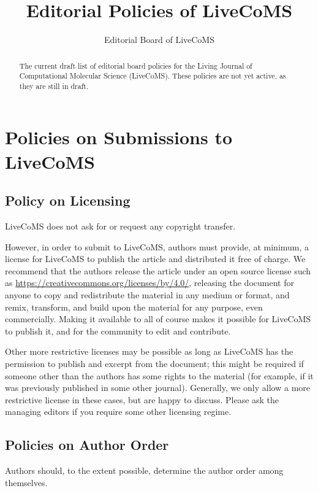 \documentclass{article}
\begin{document}
\title{Editorial Policies of LiveCoMS}
\author{Editorial Board of LiveCoMS}

\maketitle

\begin{abstract}
The current draft list of editorial board policies for the Living
Journal of Computational Molecular Science (LiveCoMS). These policies
are not yet active, as they are still in draft.
\end{abstract}

\section{Policies on Submissions to LiveCoMS}

\subsection{Policy on Licensing}

LiveCoMS does not ask for or request any copyright transfer.

However, in order to submit to LiveCoMS, authors must provide, at
minimum, a license for LiveCoMS to publish the article and distributed
it free of charge. We recommend that the authors release the article
under an open source license such as \href{Creative Commons
  Attribution}{https://creativecommons.org/licenses/by/4.0/},
releasing the document for anyone to copy and redistribute the
material in any medium or format, and remix, transform, and build upon
the material for any purpose, even commercially.  Making it available
to all of course makes it possible for LiveCoMS to publish it, and for
the community to edit and contribute.

Other more restrictive licenses may be possible as long as LiveCoMS
has the permission to publish and excerpt from the document; this
might be required if someone other than the authors has some rights to
the material (for example, if it was previously published in some
other journal). Generally, we only allow a more restrictive license in
these cases, but are happy to discuss. Please ask the managing editors
if you require some other licensing regime.

\subsection{Policies on Author Order}
Authors should, to the extent possible, determine the author order among themselves. 
\end{document}
